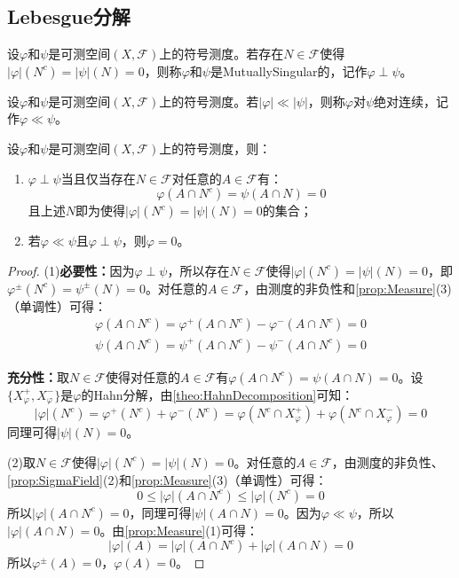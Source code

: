 \subsection{Lebesgue分解}
\begin{definition}
	设$\varphi$和$\psi$是可测空间$(X,\mathscr{F})$上的符号测度。若存在$N\in\mathscr{F}$使得$|\varphi|(N^c)=|\psi|(N)=0$，则称$\varphi$和$\psi$是\gls{MutuallySingular}的，记作$\varphi\perp\psi$。
\end{definition}
\begin{definition}
	设$\varphi$和$\psi$是可测空间$(X,\mathscr{F})$上的符号测度。若$|\varphi|\ll|\psi|$，则称$\varphi$对$\psi$绝对连续，记作$\varphi\ll\psi$。
\end{definition}
\begin{property}\label{prop:SingularSignedMeasure}
	设$\varphi$和$\psi$是可测空间$(X,\mathscr{F})$上的符号测度，则：
	\begin{enumerate}
		\item $\varphi\perp\psi$当且仅当存在$N\in\mathscr{F}$对任意的$A\in\mathscr{F}$有：
		\begin{equation*}
			\varphi(A\cap N^c)=\psi(A\cap N)=0
		\end{equation*}
		且上述$N$即为使得$|\varphi|(N^c)=|\psi|(N)=0$的集合；
		\item 若$\varphi\ll\psi$且$\varphi\perp\psi$，则$\varphi=0$。
	\end{enumerate}
\end{property}
\begin{proof}
	(1)\textbf{必要性：}因为$\varphi\perp\psi$，所以存在$N\in\mathscr{F}$使得$|\varphi|(N^c)=|\psi|(N)=0$，即$\varphi^{\pm}(N^c)=\psi^{\pm}(N)=0$。对任意的$A\in\mathscr{F}$，由测度的非负性和\cref{prop:Measure}(3)（单调性）可得：
	\begin{gather*}
		\varphi(A\cap N^c)=\varphi^+(A\cap N^c)-\varphi^-(A\cap N^c)=0 \\
		\psi(A\cap N^c)=\psi^+(A\cap N^c)-\psi^-(A\cap N^c)=0
	\end{gather*}\par
	\textbf{充分性：}取$N\in\mathscr{F}$使得对任意的$A\in\mathscr{F}$有$\varphi(A\cap N^c)=\psi(A\cap N)=0$。设$\{X_{\varphi}^+,X_{\varphi}^-\}$是$\varphi$的Hahn分解，由\cref{theo:HahnDecomposition}可知：
	\begin{equation*}
		|\varphi|(N^c)=\varphi^+(N^c)+\varphi^-(N^c)=\varphi(N^c\cap X_{\varphi}^+)+\varphi(N^c\cap X_{\varphi}^-)=0
	\end{equation*}
	同理可得$|\psi|(N)=0$。\par
	(2)取$N\in\mathscr{F}$使得$|\varphi|(N^c)=|\psi|(N)=0$。对任意的$A\in\mathscr{F}$，由测度的非负性、\cref{prop:SigmaField}(2)和\cref{prop:Measure}(3)（单调性）可得：
	\begin{equation*}
		0\leqslant|\varphi|(A\cap N^c)\leqslant|\varphi|(N^c)=0
	\end{equation*}
	所以$|\varphi|(A\cap N^c)=0$，同理可得$|\psi|(A\cap N)=0$。因为$\varphi\ll\psi$，所以$|\varphi|(A\cap N)=0$。由\cref{prop:Measure}(1)可得：
	\begin{equation*}
		|\varphi|(A)=|\varphi|(A\cap N^c)+|\varphi|(A\cap N)=0
	\end{equation*}
	所以$\varphi^{\pm}(A)=0$，$\varphi(A)=0$。
\end{proof}
